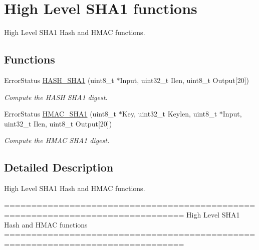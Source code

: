 \hypertarget{group___h_a_s_h___group6}{\section{High Level S\-H\-A1 functions}
\label{group___h_a_s_h___group6}
}


High Level S\-H\-A1 Hash and H\-M\-A\-C functions.  


\subsection*{Functions}
\begin{DoxyCompactItemize}
\item 
Error\-Status \hyperlink{group___h_a_s_h___group6_ga2728c02c36de6d800e1ede56ea7789cb}{H\-A\-S\-H\-\_\-\-S\-H\-A1} (uint8\-\_\-t $\ast$Input, uint32\-\_\-t Ilen, uint8\-\_\-t Output\mbox{[}20\mbox{]})
\begin{DoxyCompactList}\small\item\em Compute the H\-A\-S\-H S\-H\-A1 digest. \end{DoxyCompactList}\item 
Error\-Status \hyperlink{group___h_a_s_h___group6_ga2e38e900ca7838c1cea17cef19953a5e}{H\-M\-A\-C\-\_\-\-S\-H\-A1} (uint8\-\_\-t $\ast$Key, uint32\-\_\-t Keylen, uint8\-\_\-t $\ast$Input, uint32\-\_\-t Ilen, uint8\-\_\-t Output\mbox{[}20\mbox{]})
\begin{DoxyCompactList}\small\item\em Compute the H\-M\-A\-C S\-H\-A1 digest. \end{DoxyCompactList}\end{DoxyCompactItemize}


\subsection{Detailed Description}
High Level S\-H\-A1 Hash and H\-M\-A\-C functions. \begin{DoxyVerb} ===============================================================================
                          High Level SHA1 Hash and HMAC functions
 ===============================================================================\end{DoxyVerb}
 

